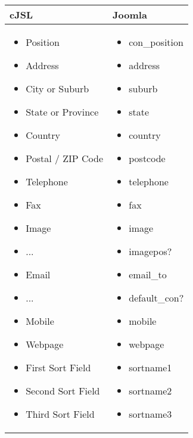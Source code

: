 \begin{minipage}{0.7\textwidth}
\begin{tabular}{|p{} | p{}|}
\hline
\textbf{cJSL} & \textbf{Joomla} \\ 
\hline
\begin{itemize}
\item  Position
\item  Address
\item  City or Suburb
\item  State or Province
\item  Country
\item  Postal / ZIP Code
\item  Telephone
\item  Fax
\item  Image
\item  ...
\item  Email
\item  ...
\item  Mobile
\item  Webpage
\item  First Sort Field
\item  Second Sort Field
\item  Third Sort Field
\end{itemize}
 & 
\begin{itemize}
\item  con\_position
\item  address
\item  suburb
\item  state
\item  country
\item  postcode
\item  telephone
\item  fax
\item  image
\item  imagepos?
\item  email\_to
\item  default\_con?
\item  mobile
\item  webpage
\item  sortname1
\item  sortname2
\item  sortname3
\end{itemize}
\\
\hline
\end{tabular}
\end{minipage}

